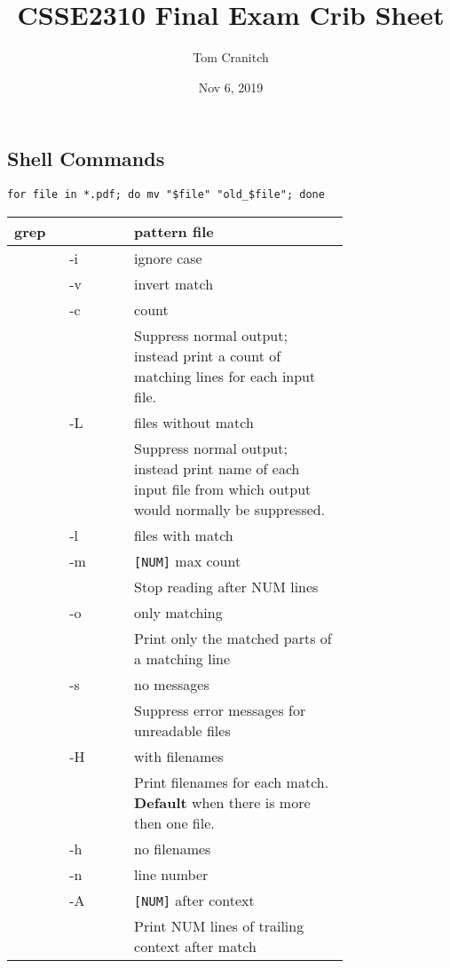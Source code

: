 \documentclass[a4]{article}
\begin{document}
	\begin{multicols*}{3}
	\allowdisplaybreaks
	\title{CSSE2310 Final Exam Crib Sheet}
	\author{Tom Cranitch}
	\date{Nov 6, 2019}
	\maketitle
	\thispagestyle{fancy}

	\scriptsize
	\section{Shell Commands}
	\label{sec:shell_commands}

	\texttt{for file in *.pdf; do mv "\$file" "old\_\$file"; done}
	
	


	\begin{tabular}{>{\ttfamily}p{0.1\linewidth}>{\ttfamily}p{0.15\linewidth}p{0.5\linewidth}}
		grep && pattern file \\\hline
			& -i & ignore case\\
			& -v & invert match\\
			& -c & count\\
			&    & Suppress normal output; instead print a count of matching lines for each input file.\\
			& -L & files without match\\
			&    & Suppress normal output; instead print name of each input file from which output would normally be suppressed.\\
			& -l & files with match\\
			& -m & \texttt{[NUM]} max count\\
			&    & Stop reading after NUM lines\\
			& -o & only matching\\
			&    & Print only the matched parts of a matching line\\
			& -s & no messages\\
			&    & Suppress error messages for unreadable files\\
			& -H & with filenames\\
			&    & Print filenames for each match. \textbf{Default} when there is more then one file.\\
			& -h & no filenames\\
			& -n & line number\\
			& -A & \texttt{[NUM]} after context\\
			&    & Print NUM lines of trailing context after match\\

\end{tabular}
\end{multicols*}
\end{document}

